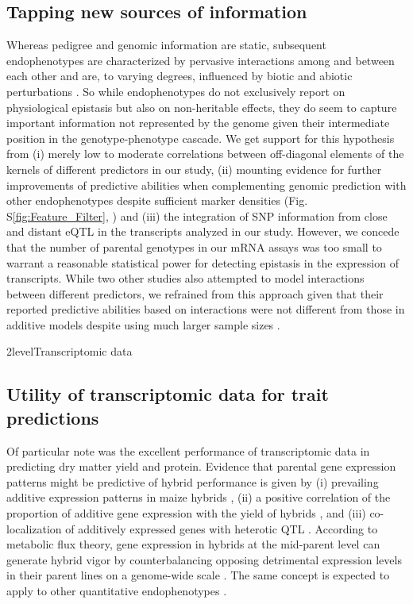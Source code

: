 \documentclass[12pt,titlepage]{article}
\begin{document}
\subsection{Tapping new sources of information}
Whereas pedigree and genomic information are static, subsequent endophenotypes 
are characterized by pervasive interactions among and between each other 
\cite{Dalchau2011,Zhu2012} and are, to varying degrees, influenced by biotic 
\cite{Rudd2015,Tzin2015} and abiotic perturbations \cite{Caldana2011,Witt2012}.
So while endophenotypes do not exclusively report on physiological epistasis but 
also on non-heritable effects, they do seem to capture important information not
represented by the genome given their intermediate position in the
genotype-phenotype cascade.
We get support for this hypothesis from (i) merely low to moderate correlations 
between off-diagonal elements of the kernels of different predictors in our 
study, (ii) mounting evidence for further improvements of predictive abilities 
when complementing genomic prediction with other endophenotypes despite 
sufficient marker densities (Fig. S\ref{fig:Feature_Filter}, )
and (iii) the integration of SNP information from close and distant eQTL in the 
transcripts analyzed in our study.
However, we concede that the number of parental genotypes in our mRNA assays
was too small to warrant a reasonable statistical power for detecting epistasis
in the expression of transcripts.
While two other studies also attempted to model interactions between different
predictors, we refrained from this approach given that their reported predictive
abilities based on interactions were not different from those in additive
models despite using much larger sample sizes \cite{Vazquez2016,Guo2016}.




\Genetics2level{Transcriptomic data}
\subsection{Utility of transcriptomic data for trait predictions}
Of particular note was the excellent performance of transcriptomic data in 
predicting dry matter yield and protein.
Evidence that parental gene expression patterns might be predictive of hybrid 
performance is given by (i) prevailing additive expression patterns in maize 
hybrids \cite{Springer2007,Stupar2008}, (ii) a positive correlation of the 
proportion of additive gene expression with the yield of hybrids \cite{Guo2006}, 
and (iii) co-localization of additively expressed genes with heterotic QTL 
\cite{Thiemann2014}.
According to metabolic flux theory, gene expression in hybrids at the 
mid-parent level can generate hybrid vigor by counterbalancing opposing 
detrimental expression levels in their parent lines on a genome-wide scale 
\cite{Kacser1981,Springer2007a}.
The same concept is expected to apply to other quantitative endophenotypes 
\cite{Lisec2011}.
\end{document}
